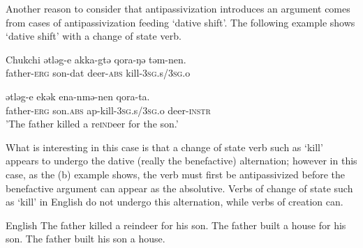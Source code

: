 \documentclass[output=paper,colorlinks,citecolor=brown,nonflat]{./langscibook}
\begin{document}
Another reason to consider that antipassivization introduces an argument comes from cases of antipassivization feeding ‘dative shift’. The following example shows ‘dative shift’ with a change of state verb.

\ea%
    Chukchi \citep{Spencer1995}\label{ex:basilico:13}
    \ea \label{ex:basilico:13a}
    \gll ǝtlǝg-e  akka-gtǝ  qora-ŋǝ  tǝm-nen.\\
    father{}-\textsc{erg}  son{}-dat  deer{}-\textsc{abs}  kill-\textsc{3sg}.s/\textsc{3sg}.o\\
    \glt
    
    \ex \label{ex:basilico:13b}
    \gll ǝtlǝg-e  ekǝk    ena-nmǝ-nen    qora-ta. \\
    father-\textsc{erg}  son.\textsc{abs}  ap{}-kill-\textsc{3sg}.s/\textsc{3sg}.o  deer-\textsc{instr}\\
    \glt 'The father killed a re\textsc{ind}eer for the son.'
    \z
    \z


What is interesting in this case is that a change of state verb such as ‘kill’ appears to undergo the dative (really the benefactive) alternation; however in this case, as the (b) example shows, the verb must first be antipassivized before the benefactive argument can appear as the absolutive. Verbs of change of state such as ‘kill’ in English do not undergo this alternation, while verbs of creation can.

\ea%
    English\label{ex:basilico:14}
    \ea The father killed a reindeer for his son.
   	\ex The father built a house for his son.
   	\ex The father built his son a house.
    \z
    \z
\end{document}
